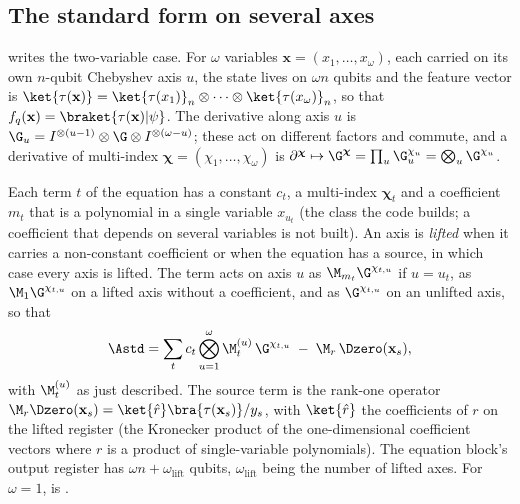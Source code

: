 \subsection{The standard form on several axes}
\label{app:pihm-multi-axis}
 writes the two-variable case. For $\omega$ variables $\mathbf x=(x_1,\dots,x_\omega)$, each carried on its own $n$-qubit Chebyshev axis $u$, the state lives on $\omega n$ qubits and the feature vector is $\ket{\tau(\mathbf x)}=\ket{\tau(x_1)}_n\otimes\dots\otimes\ket{\tau(x_\omega)}_n$, so that $f_q(\mathbf x)=\braket{\tau(\mathbf x)|\psi}$. The derivative along axis $u$ is $\G_u=I^{\otimes(u-1)}\otimes\G\otimes I^{\otimes(\omega-u)}$; these act on different factors and commute, and a derivative of multi-index $\boldsymbol\chi=(\chi_1,\dots,\chi_\omega)$ is $\partial^{\boldsymbol\chi}\mapsto\G^{\boldsymbol\chi}=\prod_u\G_u^{\chi_u}=\bigotimes_u\G^{\chi_u}$.

Each term $t$ of the equation has a constant $c_t$, a multi-index $\boldsymbol\chi_t$ and a coefficient $m_t$ that is a polynomial in a single variable $x_{u_t}$ (the class the code builds; a coefficient that depends on several variables is not built). An axis is \emph{lifted} when it carries a non-constant coefficient or when the equation has a source, in which case every axis is lifted. The term acts on axis $u$ as $\M_{m_t}\G^{\chi_{t,u}}$ if $u=u_t$, as $\M_1\G^{\chi_{t,u}}$ on a lifted axis without a coefficient, and as $\G^{\chi_{t,u}}$ on an unlifted axis, so that
\begin{equation}
    \Astd = \sum_t c_t\bigotimes_{u=1}^{\omega}\M^{(u)}_t\,\G^{\chi_{t,u}} \;-\; \M_r\,\Dzero(\mathbf x_s),
    \label{eq:app-A-multi}
\end{equation}
with $\M^{(u)}_t$ as just described. The source term is the rank-one operator $\M_r\Dzero(\mathbf x_s)=\ket{\hat r}\bra{\tau(\mathbf x_s)}/y_s$, with $\ket{\hat r}$ the coefficients of $r$ on the lifted register (the Kronecker product of the one-dimensional coefficient vectors where $r$ is a product of single-variable polynomials). The equation block's output register has $\omega n+\omega_{\mathrm{lift}}$ qubits, $\omega_{\mathrm{lift}}$ being the number of lifted axes. For $\omega=1$,  is .

